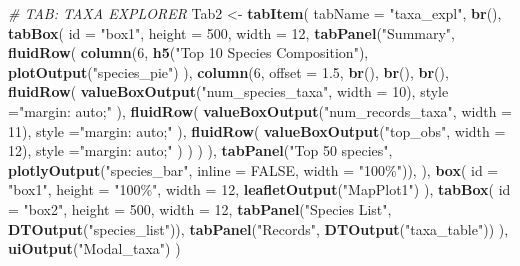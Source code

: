 \documentclass[
]{book}
\newenvironment{Shaded}{\begin{snugshade}}{\end{snugshade}}
\newcommand{\AttributeTok}[1]{\textcolor[rgb]{0.13,0.29,0.53}{#1}}
\newcommand{\CommentTok}[1]{\textcolor[rgb]{0.56,0.35,0.01}{\textit{#1}}}
\newcommand{\ConstantTok}[1]{\textcolor[rgb]{0.56,0.35,0.01}{#1}}
\newcommand{\DecValTok}[1]{\textcolor[rgb]{0.00,0.00,0.81}{#1}}
\newcommand{\FloatTok}[1]{\textcolor[rgb]{0.00,0.00,0.81}{#1}}
\newcommand{\FunctionTok}[1]{\textcolor[rgb]{0.13,0.29,0.53}{\textbf{#1}}}
\newcommand{\NormalTok}[1]{#1}
\newcommand{\OtherTok}[1]{\textcolor[rgb]{0.56,0.35,0.01}{#1}}
\newcommand{\StringTok}[1]{\textcolor[rgb]{0.31,0.60,0.02}{#1}}
\begin{document}
\begin{Shaded}
\begin{Highlighting}[]
\CommentTok{\# TAB: TAXA EXPLORER}
\NormalTok{Tab2 }\OtherTok{\textless{}{-}} \FunctionTok{tabItem}\NormalTok{(}
  \AttributeTok{tabName =} \StringTok{"taxa\_expl"}\NormalTok{,}
  \FunctionTok{br}\NormalTok{(),}
  \FunctionTok{tabBox}\NormalTok{(}
    \AttributeTok{id =} \StringTok{"box1"}\NormalTok{, }\AttributeTok{height =} \DecValTok{500}\NormalTok{, }\AttributeTok{width =} \DecValTok{12}\NormalTok{,}
    \FunctionTok{tabPanel}\NormalTok{(}\StringTok{"Summary"}\NormalTok{,}
      \FunctionTok{fluidRow}\NormalTok{(}
        \FunctionTok{column}\NormalTok{(}\DecValTok{6}\NormalTok{, }
          \FunctionTok{h5}\NormalTok{(}\StringTok{"Top 10 Species Composition"}\NormalTok{),}
          \FunctionTok{plotOutput}\NormalTok{(}\StringTok{"species\_pie"}\NormalTok{)}
\NormalTok{        ),}
        \FunctionTok{column}\NormalTok{(}\DecValTok{6}\NormalTok{, }\AttributeTok{offset =} \FloatTok{1.5}\NormalTok{, }
          \FunctionTok{br}\NormalTok{(),}
          \FunctionTok{br}\NormalTok{(),}
          \FunctionTok{br}\NormalTok{(),}
          \FunctionTok{fluidRow}\NormalTok{(}
            \FunctionTok{valueBoxOutput}\NormalTok{(}\StringTok{"num\_species\_taxa"}\NormalTok{, }\AttributeTok{width =} \DecValTok{10}\NormalTok{), }\AttributeTok{style =}\StringTok{"margin: auto;"}
\NormalTok{          ),}
          \FunctionTok{fluidRow}\NormalTok{(}
            \FunctionTok{valueBoxOutput}\NormalTok{(}\StringTok{"num\_records\_taxa"}\NormalTok{, }\AttributeTok{width =} \DecValTok{11}\NormalTok{), }\AttributeTok{style =}\StringTok{"margin: auto;"}
\NormalTok{          ),}
          \FunctionTok{fluidRow}\NormalTok{(}
            \FunctionTok{valueBoxOutput}\NormalTok{(}\StringTok{"top\_obs"}\NormalTok{, }\AttributeTok{width =} \DecValTok{12}\NormalTok{), }\AttributeTok{style =}\StringTok{"margin: auto;"}
\NormalTok{          )}
\NormalTok{        )}
\NormalTok{      )}
\NormalTok{    ),}
    \FunctionTok{tabPanel}\NormalTok{(}\StringTok{"Top 50 species"}\NormalTok{, }\FunctionTok{plotlyOutput}\NormalTok{(}\StringTok{"species\_bar"}\NormalTok{, }\AttributeTok{inline =} \ConstantTok{FALSE}\NormalTok{, }\AttributeTok{width =} \StringTok{"100\%"}\NormalTok{)),}
\NormalTok{  ),}
  \FunctionTok{box}\NormalTok{(}
    \AttributeTok{id =} \StringTok{"box1"}\NormalTok{, }\AttributeTok{height =} \StringTok{"100\%"}\NormalTok{, }\AttributeTok{width =} \DecValTok{12}\NormalTok{,}
    \FunctionTok{leafletOutput}\NormalTok{(}\StringTok{"MapPlot1"}\NormalTok{)}
\NormalTok{  ),}
  \FunctionTok{tabBox}\NormalTok{(}
    \AttributeTok{id =} \StringTok{"box2"}\NormalTok{, }\AttributeTok{height =} \DecValTok{500}\NormalTok{, }\AttributeTok{width =} \DecValTok{12}\NormalTok{,}
    \FunctionTok{tabPanel}\NormalTok{(}\StringTok{"Species List"}\NormalTok{, }\FunctionTok{DTOutput}\NormalTok{(}\StringTok{"species\_list"}\NormalTok{)),}
    \FunctionTok{tabPanel}\NormalTok{(}\StringTok{"Records"}\NormalTok{, }\FunctionTok{DTOutput}\NormalTok{(}\StringTok{"taxa\_table"}\NormalTok{))}
\NormalTok{  ),}
  \FunctionTok{uiOutput}\NormalTok{(}\StringTok{"Modal\_taxa"}\NormalTok{)}
\NormalTok{)}
\end{Highlighting}
\end{Shaded}
\end{document}
